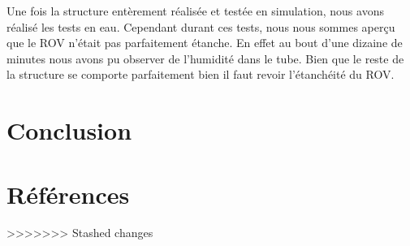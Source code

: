 \documentclass[a4paper,11pt]{report}
\begin{document}
				Une fois la structure entèrement réalisée et testée en simulation, nous avons réalisé les tests en eau. Cependant durant ces tests, nous nous sommes aperçu que le ROV n'était pas parfaitement étanche. En effet au bout d'une dizaine de minutes nous avons pu observer de l'humidité dans le tube. Bien que le reste de la structure se comporte parfaitement bien il faut revoir l'étanchéité du ROV.
				\newpage
				
\chapter{Conclusion}


 



				
				
				
\chapter{Références}
>>>>>>> Stashed changes

\listoffigures
				
\end{document}
